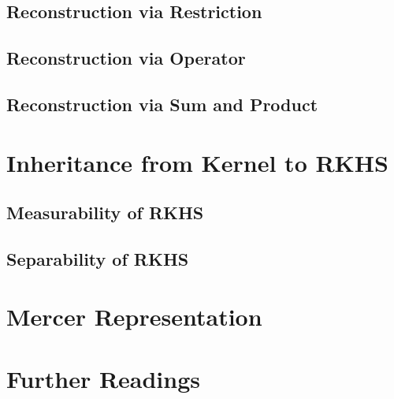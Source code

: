 \documentclass[a4paper,12pt]{article}
\theoremstyle{remark}
\theoremstyle{definition}
\theoremstyle{definition}
\theoremstyle{definition}
\begin{document}
\subsection{Reconstruction via Restriction}
\subsection{Reconstruction via Operator}
\subsection{Reconstruction via Sum and Product}

\section{Inheritance from Kernel to RKHS}
\subsection{Measurability of RKHS}
\subsection{Separability of RKHS}

\section{Mercer Representation}
\section*{Further Readings}


\end{document}
